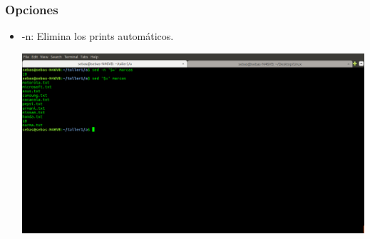 \documentclass{article}
\begin{document}
\subsubsection{Opciones}
\begin{itemize}
	\item -n: Elimina los prints automáticos.\par
        \begin{minipage}{\linewidth}
            \centering
            \includegraphics[width=\textwidth]{sed-n.png}
        \end{minipage}
\end{itemize}
\end{document}
